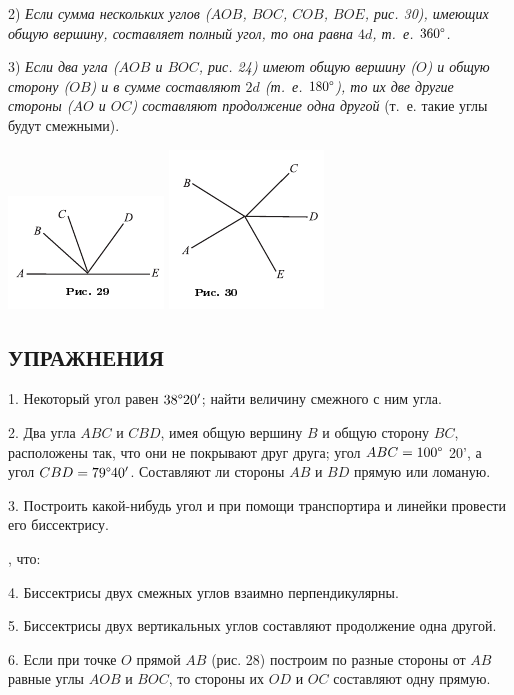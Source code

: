 \documentclass[oneside]{book}
\begin{document}
2) \emph{Если сумма нескольких углов ($AOB$, $BOC$, $COB$, $BOE$, рис. 30), имеющих общую вершину, составляет полный угол, то она равна $4d$, т.~е. $360\degree$.}

3) \emph{Если два угла ($AOB$ и $BOC$, рис. 24) имеют общую вершину ($O$) и общую сторону ($OB$) и в сумме составляют $2d$ (т.~е.
$180\degree$), то их две другие стороны ($AO$ и $OC$) составляют продолжение одна другой} (т.~е.
такие углы будут смежными).

\includegraphics{pics/ris-29}
\includegraphics{pics/ris-30}


\subsection*{УПРАЖНЕНИЯ}

1.
Некоторый угол равен $38\degree 20'$;
найти величину смежного с ним угла.

2.
Два угла $ABC$ и $CBD$, имея общую вершину $B$ и общую сторону $BC$, расположены так, что они не покрывают друг друга;
угол $ABC = 100\degree$ 20', а угол $CBD = 79\degree 40'$.
Составляют ли стороны $AB$ и $BD$ прямую или ломаную.

3.
Построить какой-нибудь угол и при помощи транспортира и линейки провести его биссектрису.

, что:

4.
Биссектрисы двух смежных углов взаимно перпендикулярны.

5.
Биссектрисы двух вертикальных углов составляют продолжение одна другой.

6.
Если при точке $O$ прямой $AB$ (рис. 28) построим по разные стороны от $AB$ равные углы $AOB$ и $BOC$, то стороны их $OD$ и $OC$ составляют одну прямую.
\end{document}

